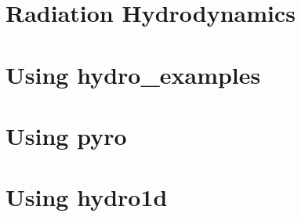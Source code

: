 \documentclass[11pt]{book}
\newcommand{\pyro}{{\sf pyro}}
\newcommand{\hydrooned}{{\sf hydro1d}}
\newcommand{\hydroex}{{\sf hydro\_examples}}
\begin{document}
\ifdefined\debugmode
\chapter{Radiation Hydrodynamics}


\fi


\appendix

\chapter{Using \hydroex}



\chapter{Using \pyro}



\chapter{Using \hydrooned}





\backmatter



\end{document}

